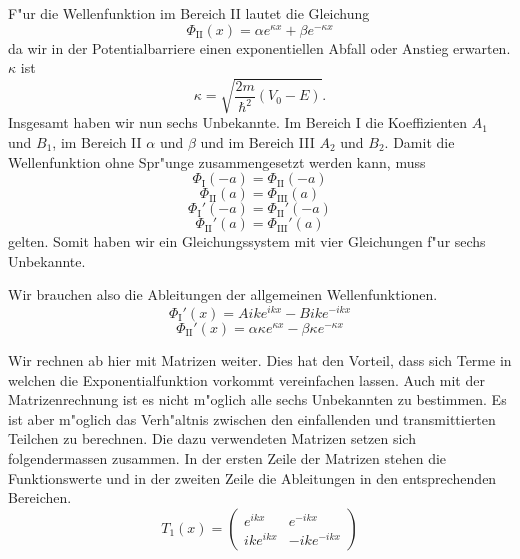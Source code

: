 \begin{refsection}
F"ur die Wellenfunktion im Bereich \textrm{II} lautet die Gleichung
\[
\Phi_\text{II}(x) = \alpha e^{\kappa x} + \beta e^{-\kappa x}
\]
da wir in der Potentialbarriere einen exponentiellen Abfall oder Anstieg erwarten. 
$\kappa$ ist
\[
\kappa = \sqrt{\frac{2m}{\hbar^2}(V_0 - E)}.
\]
Insgesamt haben wir nun sechs Unbekannte. 
Im Bereich \textrm{I} die Koeffizienten $A_1$ und $B_1$, im Bereich \textrm{II} $\alpha$ und $\beta$ und im Bereich \textrm{III} $A_2$ und $B_2$. 
Damit die Wellenfunktion ohne Spr"unge zusammengesetzt werden kann, muss
\begin{equation}
\Phi_\text{I}(-a) = \Phi_\text{II}(-a)
\label{tunnel:fktwert-a}
\end{equation}
\begin{equation}
\Phi_\text{II}(a) = \Phi_\text{III}(a)
\label{tunnel:fktwerta}
\end{equation}
\begin{equation}
\Phi_\text{I}'(-a) = \Phi_\text{II}'(-a)
\label{tunnel:steigung-a}
\end{equation}
\begin{equation}
\Phi_\text{II}'(a) = \Phi_\text{III}'(a)
\label{tunnel:steigunga}
\end{equation}
gelten.
Somit haben wir ein Gleichungssystem mit vier Gleichungen f"ur sechs Unbekannte.

Wir brauchen also die Ableitungen der allgemeinen Wellenfunktionen.
\[
\Phi_\text{I}'(x) = Aike^{ikx} - Bike^{-ikx}
\]
\[
\Phi_\text{II}'(x) = \alpha \kappa e^{\kappa x} - \beta \kappa e^{-\kappa x}
\]

Wir rechnen ab hier mit Matrizen weiter. 
Dies hat den Vorteil, dass sich Terme in welchen die Exponentialfunktion vorkommt vereinfachen lassen. 
Auch mit der Matrizenrechnung ist es nicht m"oglich alle sechs Unbekannten zu bestimmen. 
Es ist aber m"oglich das Verh"altnis zwischen den einfallenden und transmittierten Teilchen zu berechnen. 
Die dazu verwendeten Matrizen setzen sich folgendermassen zusammen.
In der ersten Zeile der Matrizen stehen die Funktionswerte und in der zweiten Zeile die Ableitungen in den entsprechenden Bereichen.
\[
T_1(x) =
\begin{pmatrix}
e^{ikx}
&
e^{-ikx}
\\
ike^{ikx}
&
-ike^{-ikx}
\end{pmatrix}
\]


\end{refsection}
